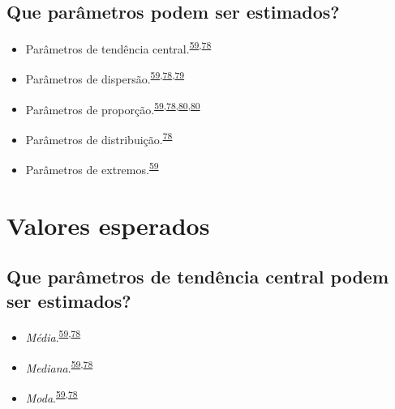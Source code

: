 \documentclass[
  a4paper,
]{book}
\begin{document}
\hypertarget{que-paruxe2metros-podem-ser-estimados}{%
\subsection{Que parâmetros podem ser estimados?}\label{que-paruxe2metros-podem-ser-estimados}}

\begin{itemize}
\item
  Parâmetros de tendência central.\textsuperscript{\protect\hyperlink{ref-Ali2016}{59},\protect\hyperlink{ref-kanji2006}{78}}
\item
  Parâmetros de dispersão.\textsuperscript{\protect\hyperlink{ref-Ali2016}{59},\protect\hyperlink{ref-kanji2006}{78},\protect\hyperlink{ref-Curran-Everett2008}{79}}
\item
  Parâmetros de proporção.\textsuperscript{\protect\hyperlink{ref-Ali2016}{59},\protect\hyperlink{ref-kanji2006}{78},\protect\hyperlink{ref-Altman1994}{80},\protect\hyperlink{ref-Altman1994}{80}}
\item
  Parâmetros de distribuição.\textsuperscript{\protect\hyperlink{ref-kanji2006}{78}}
\item
  Parâmetros de extremos.\textsuperscript{\protect\hyperlink{ref-Ali2016}{59}}
\end{itemize}

\hypertarget{valores-esperados}{%
\section{Valores esperados}\label{valores-esperados}}

\hypertarget{que-paruxe2metros-de-tenduxeancia-central-podem-ser-estimados}{%
\subsection{Que parâmetros de tendência central podem ser estimados?}\label{que-paruxe2metros-de-tenduxeancia-central-podem-ser-estimados}}

\begin{itemize}
\item
  \emph{Média}.\textsuperscript{\protect\hyperlink{ref-Ali2016}{59},\protect\hyperlink{ref-kanji2006}{78}}
\item
  \emph{Mediana}.\textsuperscript{\protect\hyperlink{ref-Ali2016}{59},\protect\hyperlink{ref-kanji2006}{78}}
\item
  \emph{Moda}.\textsuperscript{\protect\hyperlink{ref-Ali2016}{59},\protect\hyperlink{ref-kanji2006}{78}}
\end{itemize}
\end{document}
